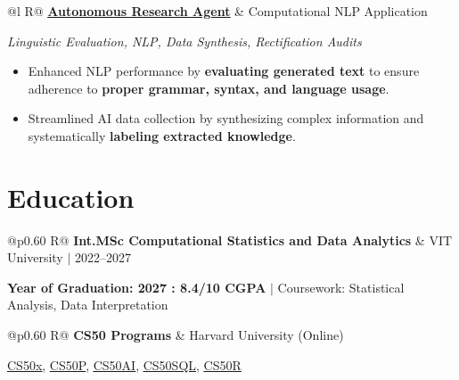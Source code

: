 \documentclass[a4paper,10pt]{article}
\newcommand{\ulink}[2]{\href{#1}{\uline{#2}}}
\newcommand{\subheading}[1]{{\color[HTML]{0A0A0A}\fontsize{12}{14}\selectfont\bfseries #1}}
\newcommand{\techstack}[1]{{\color[HTML]{5C5C5C}\fontsize{10.5}{12.5}\selectfont\itshape #1}}
\newcommand{\meta}[1]{{\color[HTML]{5C5C5C}\fontsize{10.5}{12.5}\selectfont #1}}
\begin{document}
\begin{tabularx}{\linewidth}{@{}l R@{}}
\subheading{\ulink{https://github.com/su-jin1425/Autonomous-Research-Agent}{Autonomous Research Agent}} & \meta{Computational NLP Application}
\end{tabularx}
\vspace{1pt}
\techstack{Linguistic Evaluation, NLP, Data Synthesis, Rectification Audits}
\begin{itemize}[nosep, leftmargin=1.5em, itemsep=1pt, topsep=2pt]
  \item {\color[HTML]{0A0A0A}\fontsize{11}{14}\selectfont Enhanced NLP performance by \textbf{evaluating generated text} to ensure adherence to \textbf{proper grammar, syntax, and language usage}.}
  \item {\color[HTML]{0A0A0A}\fontsize{11}{14}\selectfont Streamlined AI data collection by synthesizing complex information and systematically \textbf{labeling extracted knowledge}.}
\end{itemize}

\vspace{2pt}

\section{Education}
\vspace{2pt}

\begin{tabularx}{\linewidth}{@{}p{0.60\linewidth} R@{}}
\subheading{Int.MSc Computational Statistics and Data Analytics} & \meta{VIT University $|$ 2022--2027}
\end{tabularx}
\vspace{1pt}
{\color[HTML]{3A3A3A}\fontsize{11}{14}\selectfont \textbf{Year of Graduation: 2027 : 8.4/10 CGPA} $|$ Coursework: Statistical Analysis, Data Interpretation}

\begin{tabularx}{\linewidth}{@{}p{0.60\linewidth} R@{}}
\subheading{CS50 Programs} & \meta{Harvard University (Online)}
\end{tabularx}
\vspace{1pt}
{\color[HTML]{3A3A3A}\fontsize{11}{14}\selectfont \ulink{https://cs50.harvard.edu/certificates/b14b78df-e05c-413e-a607-1dd27303053a}{CS50x}, \ulink{https://cs50.harvard.edu/certificates/32477052-9db4-49c4-a5a4-d7e58429ca2c}{CS50P}, \ulink{https://cs50.harvard.edu/certificates/9cdb4d4a-1250-4f8e-9fd7-191864e0f919}{CS50AI}, \ulink{https://cs50.harvard.edu/certificates/bc486f24-f085-4e61-8536-80940b97a1b9}{CS50SQL}, \ulink{https://cs50.harvard.edu/certificates/666838e6-a053-4d82-b179-a60fe745fd84}{CS50R}}
\end{document}
